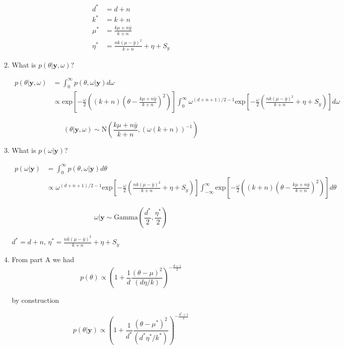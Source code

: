\documentclass[10pt]{article}
\newcommand{\by}{\mathbf{y}}
\begin{document}
\begin{enumerate}[label=(\Alph*)]
        \begin{align*}
          d^* &= d+n \\
          k^* &= k+n \\
          \mu^* &= \frac{k\mu + n\bar{y}}{k + n}\\
          \eta^* &= \frac{nk (\mu - \bar{y})^2}{k+n} + \eta + S_y
        \end{align*}


      \item What is $p(\theta| \by, \omega)$?

        \begin{align*}
          p(\theta| \by, \omega) &= \int_0^{\infty} p(\theta, \omega | \by) d\omega \\
          & \propto \text{exp}\left[  -\frac{\omega}{2} \left( (k+n) \left( \theta - \frac{k\mu + n\bar{y}}{k+n}\right)^2 \right) \right] \int_0^{\infty} \omega^{(d+n+1)/2-1}  \text{exp}\left[ - \frac{\omega}{2}\left( \frac{nk(\mu - \bar{y})^2}{k+n} + \eta + S_y\right) \right] d\omega
        \end{align*}

        $$(\theta | \by, \omega) \sim \text{N} \left( \frac{k\mu + n \bar{y}}{k+n}, (\omega(k+n))^{-1}\right) $$

      \item What is $p(\omega | \by)$?

        \begin{align*}
          p(\omega| \by) &= \int_0^{\infty} p(\theta, \omega | \by) d\theta \\
          & \propto \omega^{(d+n+1)/2-1}  \text{exp}\left[ - \frac{\omega}{2}\left( \frac{nk(\mu - \bar{y})^2}{k+n} + \eta + S_y\right) \right] \int_{-\infty}^{\infty} \text{exp}\left[  -\frac{\omega}{2} \left( (k+n) \left( \theta - \frac{k\mu + n\bar{y}}{k+n}\right)^2 \right) \right]  d\theta
        \end{align*}

        $$\omega | \by \sim \text{Gamma}\left ( \frac{d^*}{2}, \frac{\eta^*}{2}\right)$$

        $d^* = d+n$, $\eta^* = \frac{nk (\mu - \bar{y})^2}{k+n} + \eta + S_y$

      \item From part A we had 
      $$p(\theta) \propto \left ( 1 + \frac{1}{d} \frac{(\theta - \mu)^2}{(d \eta/ k)}\right)^{- \frac{d+1}{2}}$$

      by construction

      $$p(\theta | \by) \propto \left ( 1 + \frac{1}{d^*} \frac{(\theta - \mu^*)^2}{(d^* \eta^* / k^*)}\right)^{- \frac{d^*+1}{2}}$$
    \end{enumerate}
\end{document}
